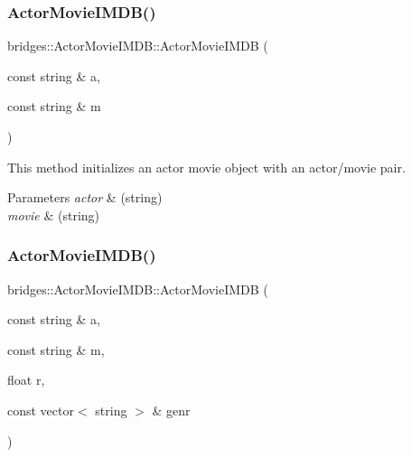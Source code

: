 \mbox{\label{classbridges_1_1_actor_movie_i_m_d_b_a25dc6c2c2fd93d6add4e11500f81e981}} 
\subsubsection{\texorpdfstring{ActorMovieIMDB()}{ActorMovieIMDB()}\hspace{0.1cm}{\footnotesize\ttfamily [2/3]}}
{\footnotesize\ttfamily bridges\+::\+Actor\+Movie\+I\+M\+D\+B\+::\+Actor\+Movie\+I\+M\+DB (\begin{DoxyParamCaption}\item[{const string \&}]{a,  }\item[{const string \&}]{m }\end{DoxyParamCaption})\hspace{0.3cm}{\ttfamily [inline]}}

This method initializes an actor movie object with an actor/movie pair.


\begin{DoxyParams}{Parameters}
{\em actor} & (string) \\
\hline
{\em movie} & (string) \\
\hline
\end{DoxyParams}
\mbox{\label{classbridges_1_1_actor_movie_i_m_d_b_a9c8f4acb9530b1a6adebb5ba1d163b4c}} 
\subsubsection{\texorpdfstring{ActorMovieIMDB()}{ActorMovieIMDB()}\hspace{0.1cm}{\footnotesize\ttfamily [3/3]}}
{\footnotesize\ttfamily bridges\+::\+Actor\+Movie\+I\+M\+D\+B\+::\+Actor\+Movie\+I\+M\+DB (\begin{DoxyParamCaption}\item[{const string \&}]{a,  }\item[{const string \&}]{m,  }\item[{float}]{r,  }\item[{const vector$<$ string $>$ \&}]{genr }\end{DoxyParamCaption})\hspace{0.3cm}{\ttfamily [inline]}}

